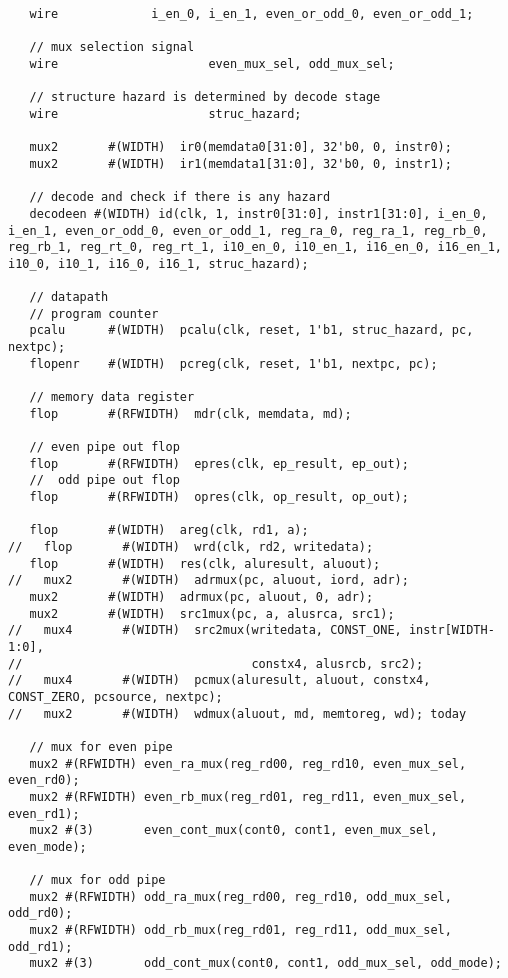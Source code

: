 \documentclass[preprint,authoryear,12pt]{elsarticle}
\begin{document}
\begin{verbatim}
   wire 		    i_en_0, i_en_1, even_or_odd_0, even_or_odd_1;

   // mux selection signal
   wire                     even_mux_sel, odd_mux_sel;

   // structure hazard is determined by decode stage
   wire                     struc_hazard;
   
   mux2       #(WIDTH)  ir0(memdata0[31:0], 32'b0, 0, instr0);
   mux2       #(WIDTH)  ir1(memdata1[31:0], 32'b0, 0, instr1);
    
   // decode and check if there is any hazard
   decodeen #(WIDTH) id(clk, 1, instr0[31:0], instr1[31:0], i_en_0, i_en_1, even_or_odd_0, even_or_odd_1, reg_ra_0, reg_ra_1, reg_rb_0, reg_rb_1, reg_rt_0, reg_rt_1, i10_en_0, i10_en_1, i16_en_0, i16_en_1, i10_0, i10_1, i16_0, i16_1, struc_hazard);
   
   // datapath
   // program counter
   pcalu      #(WIDTH)  pcalu(clk, reset, 1'b1, struc_hazard, pc, nextpc);
   flopenr    #(WIDTH)  pcreg(clk, reset, 1'b1, nextpc, pc);

   // memory data register
   flop       #(RFWIDTH)  mdr(clk, memdata, md);

   // even pipe out flop
   flop       #(RFWIDTH)  epres(clk, ep_result, ep_out);
   //  odd pipe out flop
   flop       #(RFWIDTH)  opres(clk, op_result, op_out);
   
   flop       #(WIDTH)  areg(clk, rd1, a);	
//   flop       #(WIDTH)  wrd(clk, rd2, writedata);
   flop       #(WIDTH)  res(clk, aluresult, aluout);
//   mux2       #(WIDTH)  adrmux(pc, aluout, iord, adr);
   mux2       #(WIDTH)  adrmux(pc, aluout, 0, adr);
   mux2       #(WIDTH)  src1mux(pc, a, alusrca, src1);
//   mux4       #(WIDTH)  src2mux(writedata, CONST_ONE, instr[WIDTH-1:0], 
//                                constx4, alusrcb, src2);
//   mux4       #(WIDTH)  pcmux(aluresult, aluout, constx4, CONST_ZERO, pcsource, nextpc);
//   mux2       #(WIDTH)  wdmux(aluout, md, memtoreg, wd); today

   // mux for even pipe
   mux2 #(RFWIDTH) even_ra_mux(reg_rd00, reg_rd10, even_mux_sel, even_rd0);
   mux2 #(RFWIDTH) even_rb_mux(reg_rd01, reg_rd11, even_mux_sel, even_rd1);
   mux2 #(3)       even_cont_mux(cont0, cont1, even_mux_sel, even_mode);
   
   // mux for odd pipe
   mux2 #(RFWIDTH) odd_ra_mux(reg_rd00, reg_rd10, odd_mux_sel, odd_rd0);
   mux2 #(RFWIDTH) odd_rb_mux(reg_rd01, reg_rd11, odd_mux_sel, odd_rd1);
   mux2 #(3)       odd_cont_mux(cont0, cont1, odd_mux_sel, odd_mode);
   

\end{verbatim}
\end{document}

